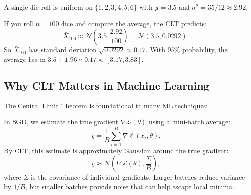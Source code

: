 \begin{example}
    A single die roll is uniform on $\{1,2,3,4,5,6\}$ with $\mu = 3.5$ and $\sigma^2 = 35/12 \approx 2.92$.

    If you roll $n = 100$ dice and compute the average, the CLT predicts:
    \[
        \bar{X}_{100} \approx \mathcal{N}\left(3.5, \frac{2.92}{100}\right) = \mathcal{N}(3.5, 0.0292).
    \]
    So $\bar{X}_{100}$ has standard deviation $\sqrt{0.0292} \approx 0.17$. With 95\% probability, the average lies in $3.5 \pm 1.96 \times 0.17 \approx [3.17, 3.83]$.
\end{example}

\subsection{Why CLT Matters in Machine Learning}

The Central Limit Theorem is foundational to many ML techniques:

\begin{remark}
    In SGD, we estimate the true gradient $\nabla \mathcal{L}(\theta)$ using a mini-batch average:
    \[
        \hat{g} = \frac{1}{B} \sum_{i=1}^B \nabla \ell(x_i, \theta).
    \]
    By CLT, this estimate is approximately Gaussian around the true gradient:
    \[
        \hat{g} \approx \mathcal{N}\left(\nabla \mathcal{L}(\theta), \frac{\Sigma}{B}\right),
    \]
    where $\Sigma$ is the covariance of individual gradients. Larger batches reduce variance by $1/B$, but smaller batches provide noise that can help escape local minima.
\end{remark}

\begin{center}
\end{center}

